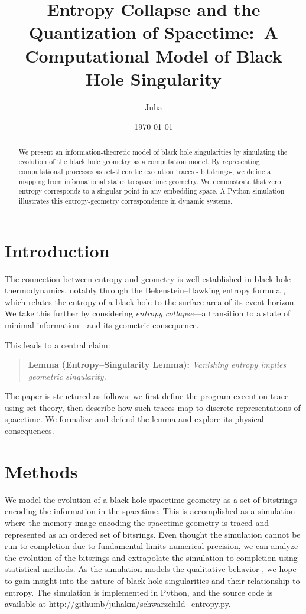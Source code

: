\documentclass[11pt]{article}
\title{Entropy Collapse and the Quantization of Spacetime:\ A Computational Model of Black Hole Singularity}
\author{Juha}
\date{\today}
\begin{document}
\maketitle

\begin{abstract}
  We present an information-theoretic model of black hole singularities by simulating the evolution of the black hole geometry as a computation model. By representing computational processes as set-theoretic execution traces - bitstrings-, we define a mapping
  from informational states to spacetime geometry. We demonstrate that zero entropy corresponds to a singular point in any
  embedding space. A Python simulation illustrates this entropy-geometry correspondence in dynamic systems.
\end{abstract}

\section{Introduction}

The connection between entropy and geometry is well established in black hole thermodynamics, notably through the Bekenstein--Hawking entropy formula \cite{Bekenstein1973,Hawking1975}, which relates the entropy of a black hole to the surface area of its event horizon. We take this further by considering \emph{entropy collapse}---a transition to a state of minimal information---and its geometric consequence.

This leads to a central claim:

\begin{quote}
  \textbf{Lemma (Entropy--Singularity Lemma):} \emph{Vanishing entropy implies geometric singularity.}
\end{quote}

The paper is structured as follows: we first define the program execution trace using set theory, then describe how such traces map to discrete representations of spacetime. We formalize and defend the lemma and explore its physical consequences.

\section{Methods}

We model the evolution of a black hole spacetime geometry as a set of bitstrings encoding the information in the spacetime. This is accomplished as a simulation where the memory image encoding the spacetime geometry is traced and represented as an ordered set of bitsrings. Even thought the simulation cannot be run to  completion due to  fundamental limits numerical precision, we can analyze the evolution of the bitsrings and extrapolate the simulation to completion using statistical methods. As the simulation
models the qualitative behavior , we hope to gain insight into the nature of black hole singularities and their relationship to entropy.
The simulation is implemented in Python, and the source code is available at \url{http://githumb/juhakm/schwarzchild\_entropy.py}.
\end{document}
